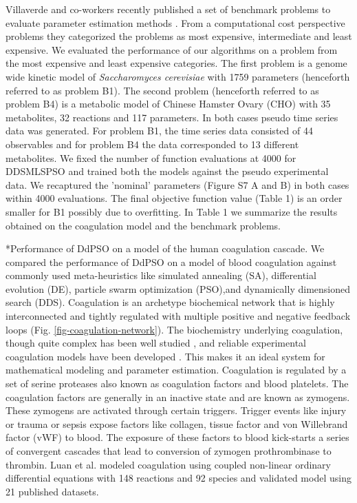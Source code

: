 \documentclass[12pt]{article}
\makeatletter
\renewcommand\subsection{\@startsection
	{subsection}{2}{0mm}
	{-0.05in}
	{-0.5\baselineskip}
	{\normalfont\normalsize\bfseries}}
\makeatother
\begin{document}
Villaverde and co-workers recently published a set of benchmark problems to evaluate parameter estimation methods \cite{villaverde2015biopredyn}. From a computational cost perspective problems they categorized the problems as most expensive, intermediate and least expensive. We evaluated the performance of our algorithms on a problem from the most expensive and least expensive categories. The first problem is a genome wide kinetic model of \textit{Saccharomyces cerevisiae} with 1759 parameters (henceforth referred to as problem B1).  The second problem (henceforth referred to as problem B4) is a metabolic model of Chinese Hamster Ovary (CHO) with 35 metabolites, 32 reactions and 117 parameters. In both cases pseudo time series data was generated. For problem B1, the time series data consisted of 44 observables and for problem B4 the data corresponded to 13 different metabolites. We fixed the number of function evaluations at 4000 for DDSMLSPSO and trained both the models against the pseudo experimental data. We recaptured the 'nominal' parameters (Figure S7 A and B)  in both cases within 4000 evaluations. The final objective function value (Table 1) is an order smaller for B1 possibly due to overfitting. In Table 1 we summarize the results obtained on the coagulation model and the benchmark problems.


\subsection*{Performance of DdPSO on a model of the human coagulation cascade.}
We compared the performance of DdPSO on a model of blood coagulation against commonly used meta-heuristics like simulated annealing (SA), differential evolution (DE), particle swarm optimization (PSO),and dynamically dimensioned search (DDS). Coagulation is an archetype biochemical network that is highly interconnected and tightly regulated with multiple positive and negative feedback loops (Fig. \ref{fig-coagulation-network}). The biochemistry underlying coagulation, though quite complex has been well studied \cite{mann2003dynamics,mann2003all,mann2003thrombin,vogler2009contact,diamond2013systems,fogelson2005coagulation,anand2003model}, and reliable experimental coagulation models have been developed \cite{hockin2002model,chatterjee2010systems,mann2006models,luan2007computationally}. This makes it an ideal system for mathematical modeling and parameter estimation. Coagulation is regulated by a set of serine proteases also known as coagulation factors and blood platelets. The coagulation factors are generally in an inactive state and are known as zymogens. These zymogens are activated through certain triggers. Trigger events like injury or trauma or sepsis expose factors like collagen, tissue factor and von Willebrand factor (vWF) to blood. The exposure of these factors to blood kick-starts a series of convergent cascades that lead to conversion of zymogen prothrombinase to thrombin.   Luan et al. modeled coagulation using coupled non-linear ordinary differential equations with 148 reactions and 92 species \cite{luan2007computationally} and validated model using 21 published datasets.
\end{document}

